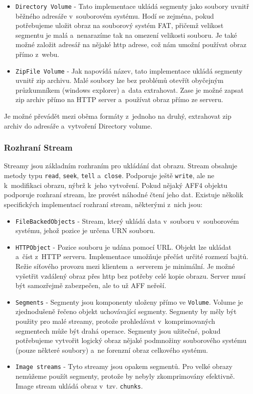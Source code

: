 \begin{itemize}
\item \texttt{Directory Volume} - Tato implementace ukládá segmenty jako soubory uvnitř běžného adresáře v~souborovém systému. Hodí se zejména, pokud potřebujeme uložit obraz na souborový systém FAT, přičemž velikost segmentu je malá a~nenarazíme tak na omezení velikosti souboru. Je také možné založit adresář na nějaké http adrese, což nám umožní používat obraz přímo z~webu.

\item \texttt{ZipFile Volume} - Jak napovídá název, tato implementace ukládá segmenty uvnitř zip archivu. Malé soubory lze bez problémů otevřít obyčejným průzkumníkem (windows explorer) a~data extrahovat. Zase je možné zapsat zip archiv přímo na HTTP server a~používat obraz přímo ze serveru.
\end{itemize}

\noindent Je možné převádět mezi oběma formáty z~jednoho na druhý, extrahovat zip archiv do adresáře a~vytvoření Directory volume.

\subsubsection{Rozhraní Stream}
Streamy jsou základním rozhraním pro ukládání dat obrazu. Stream obsahuje metody typu \texttt{read}, \texttt{seek}, \texttt{tell} a~\texttt{close}. Podporuje ještě \texttt{write}, ale ne k~modifikaci obrazu, nýbrž k~jeho vytvoření. Pokud nějaký AFF4 objektu podporuje rozhraní stream, lze provést náhodné čtení jeho dat. Existuje několik specifických implementací rozhraní stream, některými z~nich jsou:

\begin{itemize}
\item \texttt{FileBackedObjects} - Stream, který ukládá data v~souboru v~souborovém systému, jehož pozice je určena URN souboru.

\item \texttt{HTTPObject} - Pozice souboru je udána pomocí URL. Objekt lze ukládat a~číst z~HTTP serveru. Implementace umožňuje přečíst určité rozmezí bajtů. Režie síťového provozu mezi klientem a~serverem je minimální. Je možné vyšetřit vzdálený obraz přes http bez potřeby celé kopie obrazu. Server musí být samozřejmě zabezpečen, ale to už AFF neřeší.

\item \texttt{Segments} - Segmenty jsou komponenty uloženy přímo ve \texttt{Volume}. Volume je zjednodušeně řečeno objekt uchovávající segmenty. Segmenty by měly být použity pro malé streamy, protože prohledávat v~komprimovaných segmentech může být drahá operace. Segmenty jsou užitečné, pokud potřebujeme vytvořit logický obraz nějaké podmnožiny souborového systému (pouze některé soubory) a~ne forenzní obraz celkového systému.

\item \texttt{Image streams} - Tyto streamy jsou opakem segmentů. Pro velké obrazy nemůžeme použít segmenty, protože by nebyly zkomprimovány efektivně. Image stream ukládá obraz v~tzv. \texttt{chunks}.
\end{itemize}

